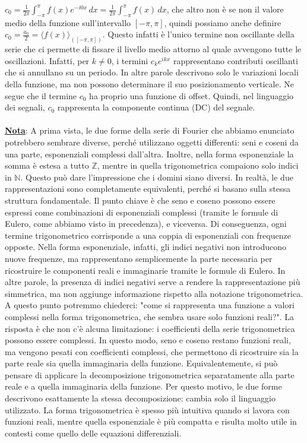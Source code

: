\documentclass[a4paper,12pt]{report}
\begin{document}
$c_0=\displaystyle\frac{1}{2\pi}\int_{-\pi}^\pi f(x) e^{-i0x}\,dx=\frac{1}{2\pi}\int_{-\pi}^\pi f(x)\,dx$, che altro non è se non il valore medio della funzione sull'intervallo $[-\pi,\pi]$, quindi possiamo anche definire $c_0=\frac{a_0}{2}=\langle f(x)\rangle_{([-\pi,\pi])}$. Questo infatti è l'unico termine non oscillante della serie che ci permette di fissare il livello medio attorno al quale avvengono tutte le oscillazioni. Infatti, per $k\neq 0$, i termini $c_k e^{ikx}$ rappresentano contributi oscillanti che si annullano su un periodo. In altre parole descrivono solo le variazioni locali della funzione, ma non possono determinare il suo posizionamento verticale. Ne segue che il termine $c_0$ ha proprio una funzione di offset. Quindi, nel linguaggio dei segnali, $c_0$ rappresenta la componente continua (DC) del segnale.
\\
\\ \underline{\textbf{Nota}}: A prima vista, le due forme della serie di Fourier che abbiamo enunciato potrebbero sembrare diverse, perché utilizzano oggetti differenti: seni e coseni da una parte, esponenziali complessi dall’altra. Inoltre, nella forma esponenziale la somma è estesa a tutto $\mathbb{Z}$, mentre in quella trigonometrica compaiono solo indici in $\mathbb{N}$. Questo può dare l’impressione che i domini siano diversi.
In realtà, le due rappresentazioni sono completamente equivalenti, perché si basano sulla stessa struttura fondamentale. Il punto chiave è che seno e coseno possono essere espressi come combinazioni di esponenziali complessi (tramite le formule di Eulero, come abbiamo visto in precedenza), e viceversa. Di conseguenza, ogni termine trigonometrico corrisponde a una coppia di esponenziali con frequenze opposte.
Nella forma esponenziale, infatti, gli indici negativi non introducono nuove frequenze, ma rappresentano semplicemente la parte necessaria per ricostruire le componenti reali e immaginarie tramite le formule di Eulero. In altre parole, la presenza di indici negativi serve a rendere la rappresentazione più simmetrica, ma non aggiunge informazione rispetto alla notazione trigonometrica.
A questo punto potremmo chiederci: "come si rappresenta una funzione a valori complessi nella forma trigonometrica, che sembra usare solo funzioni reali?". La risposta è che non c’è alcuna limitazione: i coefficienti della serie trigonometrica possono essere complessi. In questo modo, seno e coseno restano funzioni reali, ma vengono pesati con coefficienti complessi, che permettono di ricostruire sia la parte reale sia quella immaginaria della funzione. Equivalentemente, si può pensare di applicare la decomposizione trigonometrica separatamente alla parte reale e a quella immaginaria della funzione.
Per questo motivo, le due forme descrivono esattamente la stessa decomposizione: cambia solo il linguaggio utilizzato. La forma trigonometrica è spesso più intuitiva quando si lavora con funzioni reali, mentre quella esponenziale è più compatta e risulta molto utile in contesti come quello delle equazioni differenziali.
\end{document}
